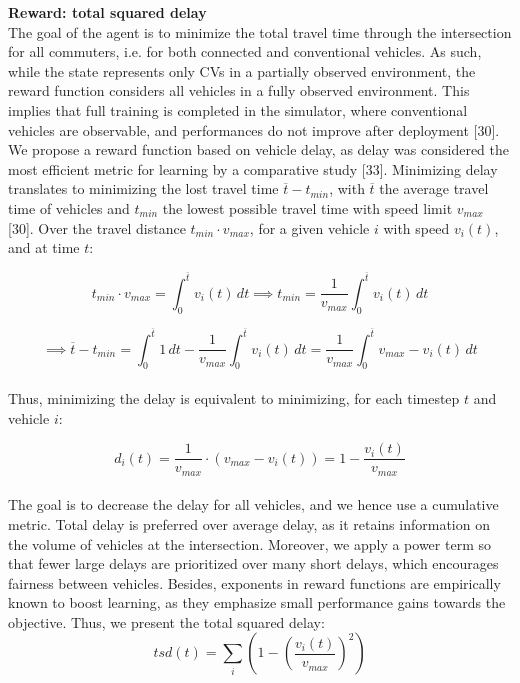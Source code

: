 \textbf{Reward: total squared delay} \\
The goal of the agent is to minimize the total travel time through the intersection for all commuters, i.e. for both connected and conventional vehicles. As such, while the state represents only CVs in a partially observed environment, the reward function considers all vehicles in a fully observed environment. This implies that full training is completed in the simulator, where conventional vehicles are observable, and performances do not improve after deployment [30]. We propose a reward function based on vehicle delay, as delay was considered the most efficient metric for learning by a comparative study [33]. Minimizing delay translates to minimizing the lost travel time $\overline{t} - t_{min}$, with $\overline{t}$ the average travel time of vehicles and $t_{min}$ the lowest possible travel time with speed limit $v_{max}$ [30]. Over the travel distance $t_{min} \cdot v_{max}$, for a given vehicle $i$ with speed $v_i(t)$, and at time $t$:

\[ t_{min} \cdot v_{max} = \int_{0}^{\overline{t}} v_i(t) \,dt \implies t_{min} = \frac{1}{v_{max}} \int_{0}^{\overline{t}} v_i(t) \,dt \]

\[ \implies \overline{t} - t_{min} =  \int_{0}^{\overline{t}} 1 \,dt - \frac{1}{v_{max}} \int_{0}^{\overline{t}} v_i(t) \,dt = \frac{1}{v_{max}} \int_{0}^{\overline{t}} v_{max} - v_i(t) \,dt \]
\\
Thus, minimizing the delay is equivalent to minimizing, for each timestep $t$ and vehicle $i$:

\[ d_i(t) = \frac{1}{v_{max}} \cdot ({v_{max}} - v_i(t)) = 1 - \frac{v_i(t)}{v_{max}} \]
\\
The goal is to decrease the delay for all vehicles, and we hence use a cumulative metric. Total delay is preferred over average delay, as it retains information on the volume of vehicles at the intersection. Moreover, we apply a power term so that fewer large delays are prioritized over many short delays, which encourages fairness between vehicles. Besides, exponents in reward functions are empirically known to boost learning, as they emphasize small performance gains towards the objective. Thus, we present the total squared delay:
\[ tsd(t) = \sum_{i} (1 - (\frac{v_i(t)}{v_{max}})^2) \]

\pagebreak


